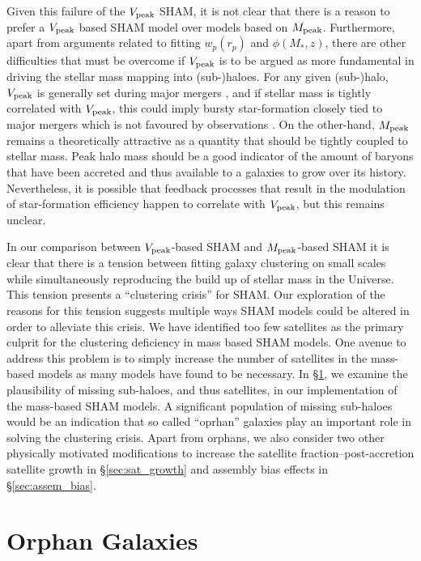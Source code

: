 \documentclass[a4paper,fleqn,usenatbib]{mnras}
\begin{document}
Given this failure of the $V_{\rm peak}$ SHAM, it is not clear that there is a reason to prefer a $V_{\rm peak}$ based SHAM model over models based on $M_{\rm peak}$.  Furthermore, apart from arguments related to fitting $w_p(r_p)$ and $\phi(M_*,z)$, there are other difficulties that must be overcome if $V_{\rm peak}$ is to be argued as more fundamental in driving the stellar mass mapping into (sub-)haloes.  For any given (sub-)halo, $V_{\rm peak}$ is generally set during major mergers \citep[1:5 or larger, ][]{Behroozi:2014bg}, and if stellar mass is tightly correlated with $V_{\rm peak}$, this could imply bursty star-formation closely tied to major mergers which is not favoured by observations \citep[e.g. star formation histories,][]{Diemer:2017gj}.  On the other-hand, $M_{\rm peak}$ remains a theoretically attractive as a quantity that should be tightly coupled to stellar mass.  Peak halo mass should be a good indicator of the amount of baryons that have been accreted and thus available to a galaxies to grow over its history.  Nevertheless, it is possible that feedback processes that result in the modulation of star-formation efficiency happen to correlate with $V_{\rm peak}$, but this remains unclear.  

In our comparison between $V_{\rm peak}$-based SHAM and $M_{\rm peak}$-based SHAM it is clear that there is a tension between fitting galaxy clustering on small scales while simultaneously reproducing the build up of stellar mass in the Universe.  This tension presents a ``clustering crisis'' for SHAM.  Our exploration of the reasons for this tension suggests multiple ways SHAM models could be altered in order to alleviate this crisis.  We have identified too few satellites as the primary culprit for the clustering deficiency in mass based SHAM models.  One avenue to address this problem is to simply increase the number of satellites in the mass-based models as many models have found to be necessary.  In \S \ref{sec:orphans}, we examine the plausibility of missing sub-haloes, and thus satellites, in our implementation of the mass-based SHAM models.  A significant population of missing sub-haloes would be an indication that so called ``oprhan'' galaxies play an important role in solving the clustering crisis.  Apart from orphans, we also consider two other physically motivated modifications to increase the satellite fraction--post-accretion satellite growth in \S \ref{sec:sat_growth} and assembly bias effects in \S \ref{sec:assem_bias}.   


\section{Orphan Galaxies}
\label{sec:orphans}
\end{document}
